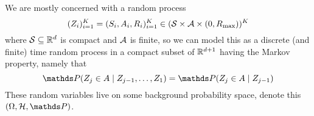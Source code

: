 
We are mostly concerned with
a random process
\begin{equation}
(Z_i)_{i=1}^K
= (S_i, A_i, R_i)_{i=1}^K \in (\mathcal{S}\times\mathcal{A}\times(0,R_{\max}))^K
\end{equation}
where $\mathcal{S} \subseteq \mathbb{R}^d$ is compact and $\mathcal{A}$ is finite,
so we can model this as a discrete (and finite) time random process in a compact
subset of $\mathbb{R}^{d+1}$ having the Markov property, namely that
\begin{equation}
  \Prob(Z_j \in A \mid Z_{j-1}, \dots, Z_1) = \Prob(Z_j \in A \mid Z_{j-1})
  \label{eq:MarkovProperty}
\end{equation}
These random variables live on some background probability space, denote this
$(\Omega, \Cal{H}, \Prob)$.
